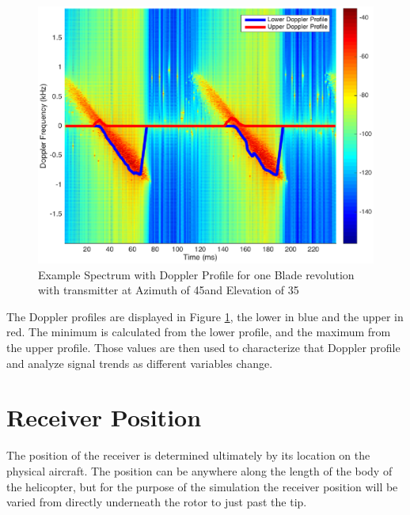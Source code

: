 \begin{figure}
	\begin{center}
		\includegraphics[width=15cm]{images/simulation/test_analysis_spectrogram_with_envelope.eps}
		\caption{Example Spectrum with Doppler Profile for one Blade revolution with transmitter at Azimuth of 45\textdegree \space and Elevation of 35\textdegree}
		\label{fig:test_spec_w_doppler_profile}
	\end{center}
\end{figure}

The Doppler profiles are displayed in Figure \ref{fig:test_spec_w_doppler_profile}, the lower in blue and the upper in red. The minimum is calculated from the lower profile, and the maximum from the upper profile. Those values are then used to characterize that Doppler profile and analyze signal trends as different variables change.

\section{Receiver Position}
The position of the receiver is determined ultimately by its location on the physical aircraft. The position can be anywhere along the length of the body of the helicopter, but for the purpose of the simulation the receiver position will be varied from directly underneath the rotor to just past the tip. 

